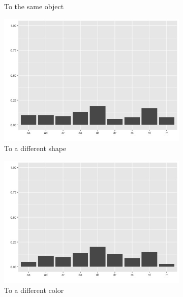 \documentclass{article}
\begin{document}
\begin{figure}[h!]
\begin{subfigure}[t]{0.25\textwidth}
    \caption{To the same object} \label{fig:sim_agg_g6}
  \end{subfigure}

  \vspace{1em}
  \begin{subfigure}[t]{0.25\textwidth}
    \centering
    \includegraphics[width=\linewidth]{sim_agg_g2} 
    \caption{To a different shape} \label{fig:sim_agg_g2}
  \end{subfigure}
  \begin{subfigure}[t]{0.25\textwidth}
    \centering
    \includegraphics[width=\linewidth]{sim_agg_g4} 
    \caption{To a different color} \label{fig:sim_agg_g4}
  \end{subfigure}
  \begin{subfigure}[t]{0.25\textwidth}
    \centering

\end{subfigure}
\end{figure}
\end{document}
